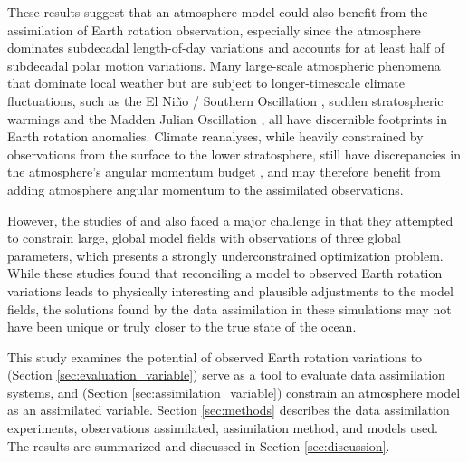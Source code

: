These results suggest that an atmosphere model could also benefit from the assimilation of Earth rotation observation, especially since the atmosphere dominates subdecadal length-of-day variations and accounts for at least half of subdecadal polar motion variations. 
Many large-scale atmospheric phenomena that dominate local weather but are subject to longer-timescale climate fluctuations, such as 
the El Ni\~no / Southern Oscillation \citep{Chao1984},
sudden stratospheric warmings \citep{Neef2014} and the Madden Julian Oscillation \citep{Weickmann1992}, all have discernible footprints in Earth rotation anomalies. 
Climate reanalyses, while heavily constrained by observations from the surface to the lower stratosphere, still have discrepancies in the atmosphere's angular momentum budget \citep{Berrisford2011,Lehmann2012}, and  may therefore benefit from adding atmosphere angular momentum to the assimilated observations. 

However, the studies of \citet{Saynisch2010,Saynisch2011} and \citet{Saynisch2012} also faced a major challenge in that they attempted to constrain large, global model fields with observations of three global parameters, which presents a strongly underconstrained optimization problem. 
While these studies found that reconciling a model to observed Earth rotation variations leads to physically interesting and plausible adjustments to the model fields, the solutions found by the data assimilation in these simulations may not have been unique or truly closer to the true state of the ocean.  

This study examines the potential of observed Earth rotation variations to (Section \ref{sec:evaluation_variable}) serve as a tool to evaluate data assimilation systems, and (Section \ref{sec:assimilation_variable}) constrain an atmosphere model as an assimilated variable.
Section \ref{sec:methods} describes the data assimilation experiments, observations assimilated, assimilation method, and models used.
The results are summarized and discussed in Section \ref{sec:discussion}.
